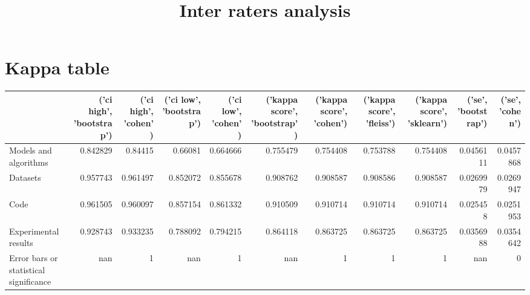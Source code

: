 \documentclass{article}
\title{Inter raters analysis}
\begin{document}
\maketitle

\section{Kappa table} 

\begin{table}[H]

\centering

\begin{tabular}{lrrrrrrrrrr}
\hline
                                        &   ('ci high', 'bootstrap') &   ('ci high', 'cohen') &   ('ci low', 'bootstrap') &   ('ci low', 'cohen') &   ('kappa score', 'bootstrap') &   ('kappa score', 'cohen') &   ('kappa score', 'fleiss') &   ('kappa score', 'sklearn') &   ('se', 'bootstrap') &   ('se', 'cohen') \\
\hline
 Models and algorithms                  &                   0.842829 &               0.84415  &                  0.66081  &              0.664666 &                       0.755479 &                   0.754408 &                    0.753788 &                     0.754408 &             0.0456111 &         0.0457868 \\
 Datasets                               &                   0.957743 &               0.961497 &                  0.852072 &              0.855678 &                       0.908762 &                   0.908587 &                    0.908586 &                     0.908587 &             0.0269979 &         0.0269947 \\
 Code                                   &                   0.961505 &               0.960097 &                  0.857154 &              0.861332 &                       0.910509 &                   0.910714 &                    0.910714 &                     0.910714 &             0.025458  &         0.0251953 \\
 Experimental results                   &                   0.928743 &               0.933235 &                  0.788092 &              0.794215 &                       0.864118 &                   0.863725 &                    0.863725 &                     0.863725 &             0.0356988 &         0.0354642 \\
 Error bars or statistical significance &                 nan        &               1        &                nan        &              1        &                     nan        &                   1        &                    1        &                     1        &           nan         &         0         \\

\end{tabular}
\end{table}
\end{document}
